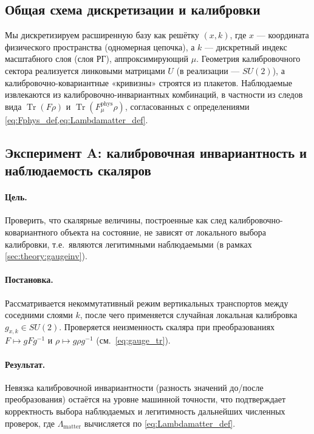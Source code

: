 \documentclass[11pt,a4paper]{article}
\DeclareMathOperator{\Tr}{Tr}
\theoremstyle{definition}
\theoremstyle{plain}
\theoremstyle{remark}
\begin{document}
\subsection{Общая схема дискретизации и калибровки}
\label{sec:numerics:setup}

Мы дискретизируем расширенную базу как решётку $(x,k)$, где $x$ — координата физического пространства
(одномерная цепочка), а $k$ — дискретный индекс масштабного слоя (слоя РГ), аппроксимирующий $\mu$.
Геометрия калибровочного сектора реализуется линковыми матрицами $U$ (в реализации — $SU(2)$),
а калибровочно-ковариантные «кривизны» строятся из плакетов.
Наблюдаемые извлекаются из калибровочно-инвариантных комбинаций, в частности из следов вида
$\Tr(F\rho)$ и $\Tr(F^{\mathrm{phys}}_\mu\rho)$, согласованных с определениями \cref{eq:Fphys_def,eq:Lambdamatter_def}.

\subsection{Эксперимент A: калибровочная инвариантность и наблюдаемость скаляров}
\label{sec:numerics:A}

\paragraph{Цель.}
Проверить, что скалярные величины, построенные как след калибровочно-ковариантного объекта на состояние,
не зависят от локального выбора калибровки, т.е.\ являются легитимными наблюдаемыми (в рамках \cref{sec:theory:gaugeinv}).

\paragraph{Постановка.}
Рассматривается некоммутативный режим вертикальных транспортов между соседними слоями $k$,
после чего применяется случайная локальная калибровка $g_{x,k}\in SU(2)$.
Проверяется неизменность скаляра при преобразованиях
$F\mapsto gFg^{-1}$ и $\rho\mapsto g\rho g^{-1}$ (см.\ \cref{eq:gauge_tr}).

\paragraph{Результат.}
Невязка калибровочной инвариантности (разность значений до/после преобразования) остаётся на уровне машинной точности,
что подтверждает корректность выбора наблюдаемых и легитимность дальнейших численных проверок,
где $\Lambda_{\mathrm{matter}}$ вычисляется по \cref{eq:Lambdamatter_def}.
\end{document}
